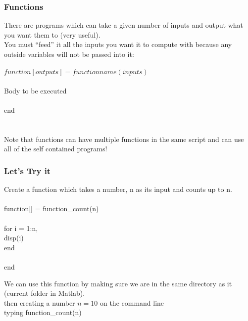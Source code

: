 \documentclass{beamer}
\newcommand{\tab}{\hspace{10mm}}
\begin{document}
\begin{frame}
\frametitle{Functions}
There are programs which can take a given number of inputs and output what you want them to (very useful). \\
You must ``feed'' it all the inputs you want it to compute with because any outside variables will not be passed into it: \\
\ \\
$function[outputs] = function name(inputs)$\\
\ \\
\tab Body to be executed \\
\ \\
end\\
\ \\
\ \\

Note that functions can have multiple functions in the same script and can use all of the self contained programs! 

\end{frame}





\begin{frame}
\frametitle{Let's Try it} 

Create a function which takes a number, n as its input and counts up to n. 
\ \\
\ \\
\pause
function[] = function\_count(n)\\
\ \\
\tab for i = 1:n, \\
\tab \tab disp(i) \\
\tab end\\
\ \\
end

We can use this function by making sure we are in the same directory as it (current folder in Matlab). \\
then creating a number $n = 10$ on the command line \\
typing function\_count(n)

\end{frame}
\end{document}
